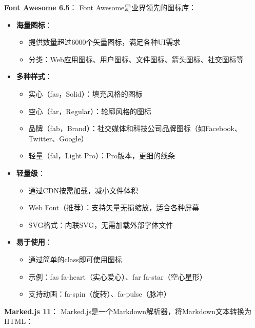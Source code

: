\documentclass[12pt,a4paper]{article}
\begin{document}
\textbf{Font Awesome 6.5}：
Font Awesome是业界领先的图标库：

\begin{itemize}
    \item \textbf{海量图标}：
        \begin{itemize}
            \item 提供数量超过6000个矢量图标，满足各种UI需求
            \item 分类：Web应用图标、用户图标、文件图标、箭头图标、社交图标等
        \end{itemize}
    \item \textbf{多种样式}：
        \begin{itemize}
            \item 实心（fas，Solid）：填充风格的图标
            \item 空心（far，Regular）：轮廓风格的图标
            \item 品牌（fab，Brand）：社交媒体和科技公司品牌图标（如Facebook、Twitter、Google）
            \item 轻量（fal，Light Pro）：Pro版本，更细的线条
        \end{itemize}
    \item \textbf{轻量级}：
        \begin{itemize}
            \item 通过CDN按需加载，减小文件体积
            \item Web Font（推荐）：支持矢量无损缩放，适合各种屏幕
            \item SVG格式：内联SVG，无需加载外部字体文件
        \end{itemize}
    \item \textbf{易于使用}：
        \begin{itemize}
            \item 通过简单的class即可使用图标
            \item 示例：fas fa-heart（实心爱心）、far fa-star（空心星形）
            \item 支持动画：fa-spin（旋转）、fa-pulse（脉冲）
        \end{itemize}
\end{itemize}

\textbf{Marked.js 11}：
Marked.js是一个Markdown解析器，将Markdown文本转换为HTML：
\end{document}
